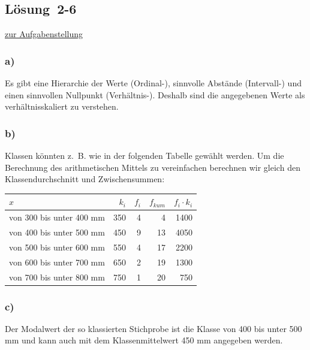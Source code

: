 \documentclass[
  11pt,
  ngerman,
  a4paper,
]{report}
\begin{document}
\hypertarget{loesung-2-6}{%
\subsection{Lösung~2-6}\label{loesung-2-6}}

\protect\hyperlink{aufgabe-2-6}{zur Aufgabenstellung}

\hypertarget{a-7}{%
\subsubsection{a)}\label{a-7}}

Es gibt eine Hierarchie der Werte (Ordinal-), sinnvolle Abstände (Intervall-) und einen sinnvollen Nullpunkt (Verhältnis-). Deshalb sind die angegebenen Werte als verhältnisskaliert zu verstehen.

\hypertarget{b-7}{%
\subsubsection{b)}\label{b-7}}

Klassen könnten z.~B. wie in der folgenden Tabelle gewählt werden. Um die Berechnung des arithmetischen Mittels zu vereinfachen berechnen wir gleich den Klassendurchschnitt und Zwischensummen:

\begin{table}[H]
\centering
\begin{tabular}{lrrrr}
\toprule
\textbf{$x$} & \textbf{$k_i$} & \textbf{$f_i$} & \textbf{$f_{kum}$} & \textbf{$f_i \cdot k_i$}\\
\midrule
von 300 bis unter 400 mm & 350 & 4 & 4 & 1400\\
von 400 bis unter 500 mm & 450 & 9 & 13 & 4050\\
von 500 bis unter 600 mm & 550 & 4 & 17 & 2200\\
von 600 bis unter 700 mm & 650 & 2 & 19 & 1300\\
von 700 bis unter 800 mm & 750 & 1 & 20 & 750\\
\bottomrule
\end{tabular}
\end{table}

\hypertarget{c-6}{%
\subsubsection{c)}\label{c-6}}

Der Modalwert der so klassierten Stichprobe ist die Klasse von 400 bis unter 500 mm und kann auch mit dem Klassenmittelwert 450 mm angegeben werden.
\end{document}
